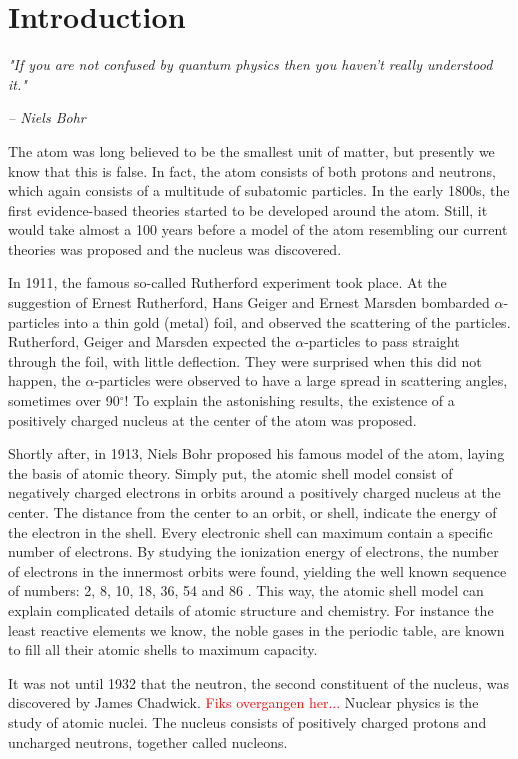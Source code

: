 \documentclass[twoside,english]{uiofysmaster/uiofysmaster}
\begin{document}
\chapter{Introduction}
\epigraph{\textit{"If you are not confused by quantum physics then you haven't really understood it."}}{\textit{– Niels Bohr}}


The atom was long believed to be the smallest unit of matter, but presently we know that this is false. 
In fact, the atom consists of both protons and neutrons, which again consists of a multitude of subatomic particles.
In the early 1800s, the first evidence-based theories started to be developed around the atom.
Still, it would take almost a 100 years before a model of the atom resembling our current theories was proposed and the nucleus was discovered. 

In 1911, the famous so-called Rutherford experiment took place.
At the suggestion of Ernest Rutherford, Hans Geiger and Ernest Marsden bombarded $\alpha$-particles into a thin gold (metal) foil, and observed the scattering of the particles.
Rutherford, Geiger and Marsden expected the $\alpha$-particles to pass straight through the foil, with little deflection. 
They were surprised when this did not happen, the $\alpha$-particles were observed to have a large spread in scattering angles, sometimes over 90$^\circ$!
To explain the astonishing results, the existence of a positively charged nucleus at the center of the atom was proposed. 

Shortly after, in 1913, Niels Bohr proposed his famous model of the atom, laying the basis of atomic theory.
Simply put, the atomic shell model consist of negatively charged electrons in orbits around a positively charged nucleus at the center. 
The distance from the center to an orbit, or shell, indicate the energy of the electron in the shell. 
Every electronic shell can maximum contain a specific number of electrons. 
By studying the ionization energy of electrons, the number of electrons in the innermost orbits were found, yielding the well known sequence of numbers: 2, 8, 10, 18, 36, 54 and 86 \cite{Heyde}. 
This way, the atomic shell model can explain complicated details of atomic structure and chemistry. 
For instance the least reactive elements we know, the noble gases in the periodic table, are known to fill all their atomic shells to maximum capacity.

It was not until 1932 that the neutron, the second constituent of the nucleus, was discovered by James Chadwick. 
\textcolor{red}{Fiks overgangen her...}\newline
Nuclear physics is the study of atomic nuclei. 
The nucleus consists of positively charged protons and uncharged neutrons, together called nucleons. 
\end{document}
